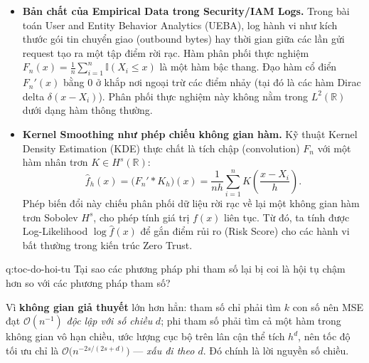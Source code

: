 \begin{itemize}
\item \textbf{Bản chất của Empirical Data trong Security/IAM Logs.} Trong bài toán User and Entity Behavior Analytics (UEBA), log hành vi như kích thước gói tin chuyển giao (outbound bytes) hay thời gian giữa các lần gửi request tạo ra một tập điểm rời rạc. Hàm phân phối thực nghiệm $F_n(x)=\frac1n\sum_{i=1}^n\mathbb{I}(X_i\le x)$ là một hàm bậc thang. Đạo hàm cổ điển $F_n'(x)$ bằng $0$ ở khắp nơi ngoại trừ các điểm nhảy (tại đó là các hàm Dirac delta $\delta(x-X_i)$). Phân phối thực nghiệm này không nằm trong $L^2(\mathbb{R})$ dưới dạng hàm thông thường.
\item \textbf{Kernel Smoothing như phép chiếu không gian hàm.} Kỹ thuật Kernel Density Estimation (KDE) thực chất là tích chập (convolution) $F_n$ với một hàm nhân trơn $K\in H^{s}(\mathbb{R})$:
\[ \widehat f_h(x)=\big(F_n'*K_h\big)(x)=\frac{1}{nh}\sum_{i=1}^{n}K\!\left(\frac{x-X_i}{h}\right). \]
Phép biến đổi này chiếu phân phối dữ liệu rời rạc về lại một không gian hàm trơn Sobolev $H^{s}$, cho phép tính giá trị $f(x)$ liên tục. Từ đó, ta tính được Log-Likelihood $\log\widehat f(x)$ để gắn điểm rủi ro (Risk Score) cho các hành vi bất thường trong kiến trúc Zero Trust.
\end{itemize}


\begin{cauhoi}{q:toc-do-hoi-tu}
Tại sao các phương pháp phi tham số lại bị coi là hội tụ chậm hơn so với các phương pháp tham số?
\end{cauhoi}

\begin{chot}
Vì \textbf{không gian giả thuyết} lớn hơn hẳn: tham số chỉ phải tìm $k$ con số nên MSE đạt $\mathcal{O}(n^{-1})$ \emph{độc lập với số chiều} $d$; phi tham số phải tìm cả một hàm trong không gian vô hạn chiều, ước lượng cục bộ trên lân cận thể tích $h^{d}$, nên tốc độ tối ưu chỉ là $\mathcal{O}\big(n^{-2s/(2s+d)}\big)$ --- \emph{xấu đi theo $d$}. Đó chính là lời nguyền số chiều.
\end{chot}

